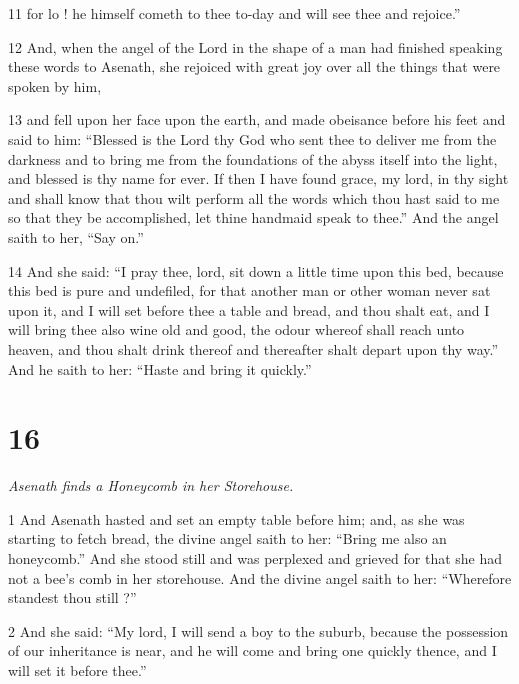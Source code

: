 \par 11 for lo ! he himself cometh to thee to-day and will see thee and rejoice.” 

\par 12 And, when the angel of the Lord in the shape of a man had finished speaking these words to Asenath, she rejoiced with great joy over all the things that were spoken by him, 

\par 13 and fell upon her face upon the earth, and made obeisance before his feet and said to him: “Blessed is the Lord thy God who sent thee to deliver me from the darkness and to bring me from the foundations of the abyss itself into the light, and blessed is thy name for ever. If then I have found grace, my lord, in thy sight and shall know that thou wilt perform all the words which thou hast said to me so that they be accomplished, let thine handmaid speak to thee.” And the angel saith to her, “Say on.” 

\par 14 And she said: “I pray thee, lord, sit down a little time upon this bed, because this bed is pure and undefiled, for that another man or other woman never sat upon it, and I will set before thee a table and bread, and thou shalt eat, and I will bring thee also wine old and good, the odour whereof shall reach unto heaven, and thou shalt drink thereof and thereafter shalt depart upon thy way.” And he saith to her: “Haste and bring it quickly.”

\chapter{16}

\par \textit{Asenath finds a Honeycomb in her Storehouse.}

\par 1 And Asenath hasted and set an empty table before him; and, as she was starting to fetch bread, the divine angel saith to her: “Bring me also an honeycomb.” And she stood still and was perplexed and grieved for that she had not a bee's comb in her storehouse. And the divine angel saith to her: “Wherefore standest thou still ?” 

\par 2 And she said: “My lord, I will send a boy to the suburb, because the possession of our inheritance is near, and he will come and bring one quickly thence, and I will set it before thee.” 

